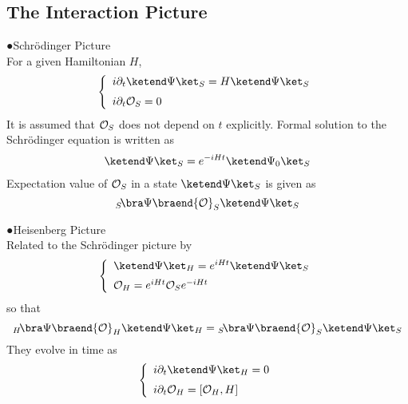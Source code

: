 \subsection{The Interaction Picture}
●Schr\"odinger Picture\\
For a given Hamiltonian $H$,
\begin{eqnarray}
\left\{
\begin{array}{l}
i \partial_t 
\ketend \Psi \ket_S
=
H \ketend \Psi \ket_S
\vspace{2mm}
\\
i \partial_t 
{\cal O}_S = 0
\end{array}
\right.
\end{eqnarray}
It is assumed that ${\cal O}_S$ does not depend on $t$ explicitly.
Formal solution to the Schr\"odinger equation is written as
\begin{eqnarray}
\ketend \Psi \ket_S = e^{-iHt} \ketend \Psi_0 \ket_S
\label{eqn:SchrPicFormalSol}
\end{eqnarray}
Expectation value of ${\cal O}_S$ in a state $\ketend \Psi \ket_S$ is given as
\begin{equation}
{}_S\!\bra \Psi \braend {\cal O}_S \ketend \Psi \ket_S
\end{equation}

\bigskip

\noindent
●Heisenberg Picture\\
Related to the Schr\"odinger picture by
\begin{eqnarray}
\left\{
\begin{array}{l}
\ketend \Psi \ket_H
=
e^{iHt}
\ketend \Psi \ket_S
\vspace{2mm}
\\
{\cal O}_H = 
e^{iHt} {\cal O}_S e^{-iHt}
\end{array}
\right.
\end{eqnarray}
so that
\begin{equation}
{}_H\!\bra \Psi \braend {\cal O}_H \ketend \Psi \ket_H
=
{}_S\!\bra \Psi \braend {\cal O}_S \ketend \Psi \ket_S
\end{equation}
They evolve in time as
\begin{eqnarray}
\left\{
\begin{array}{l}
i \partial_t 
\ketend \Psi \ket_H
=
0
\vspace{2mm}
\\
i \partial_t 
{\cal O}_H = 
[ {\cal O}_H, H]
\end{array}
\right.
\end{eqnarray}

